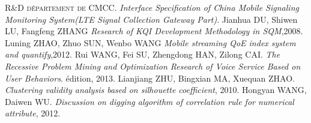 \begin{thebibliography}{ABC}	

    
    R\&D \textsc{département de }CMCC.   \emph{Interface Specification of China Mobile Signaling Monitoring System(LTE Signal Collection Gateway Part)}.
    Jianhua DU, Shiwen LU, Fangfeng ZHANG  \emph{Research of KQI Development Methodology in SQM},2008.
    Luning ZHAO, Zhuo SUN, Wenbo WANG  \emph{Mobile streaming QoE index system and quantify},2012.
     Rui WANG, Fei SU, Zhengdong HAN, Zilong CAI. \emph{The Recessive Problem Mining and Optimization Research of Voice Service Based on User Behaviors}. édition, 2013.
     Lianjiang ZHU, Bingxian MA, Xuequan ZHAO. \emph{Clustering validity analysis based on silhouette coefficient}, 2010.
      Hongyan WANG, Daiwen WU. \emph{Discussion on digging algorithm of correlation rule for numerical attribute}, 2012.
\end{thebibliography}

%